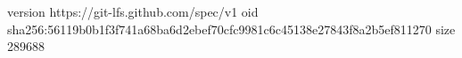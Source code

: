 version https://git-lfs.github.com/spec/v1
oid sha256:56119b0b1f3f741a68ba6d2ebef70cfc9981c6c45138e27843f8a2b5ef811270
size 289688
